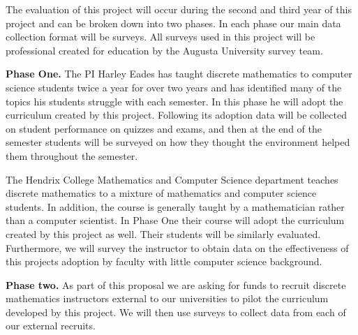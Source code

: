 The evaluation of this project will occur during the second and third
year of this project and can be broken down into two phases.  In each
phase our main data collection format will be surveys.  All surveys
used in this project will be professional created for education by the
Augusta University survey team.

\textbf{Phase One.} The PI Harley Eades has taught discrete
mathematics to computer science students twice a year for over two
years and has identified many of the topics his students struggle with
each semester.  In this phase he will adopt the curriculum created by
this project.  Following its adoption data will be collected on
student performance on quizzes and exams, and then at the end of the
semester students will be surveyed on how they thought the \thelang{}
environment helped them throughout the semester.

The Hendrix College Mathematics and Computer Science department
teaches discrete mathematics to a mixture of mathematics and computer
science students.  In addition, the course is generally taught by a
mathematician rather than a computer scientist.  In Phase One their
course will adopt the curriculum created by this project as well.
Their students will be similarly evaluated.  Furthermore, we will
survey the instructor to obtain data on the effectiveness of this
projects adoption by faculty with little computer science background.

\textbf{Phase two.} As part of this proposal we are asking for funds
to recruit discrete mathematics instructors external to our
universities to pilot the curriculum developed by this project. We
will then use surveys to collect data from each of our external
recruits.
